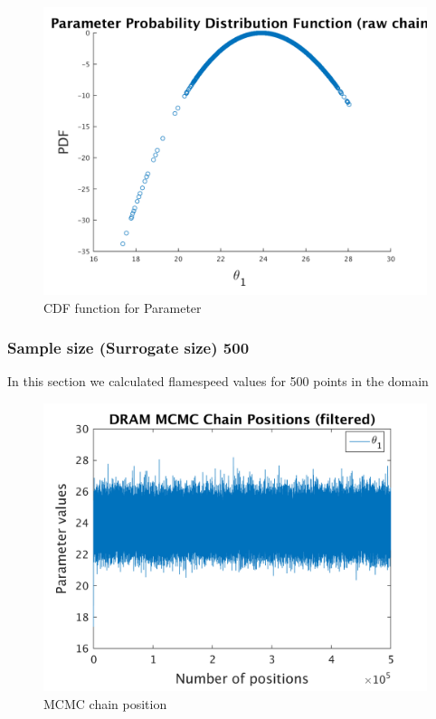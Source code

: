 \begin{figure}[H]
  
  \centering
   \includegraphics[scale=0.75]{100_results/outputData_100/ip_logLike_unified}
   \caption{CDF function for Parameter }
\end{figure}


\subsubsection{Sample size (Surrogate size) 500 }

In this section we calculated flamespeed values for 500 points in the domain 

\begin{figure}[H]
  
  \centering
   \includegraphics[scale=0.75]{100_results/outputData_500/simple_ip_chain_pos_filt}
   \caption{MCMC chain position }
\end{figure}


